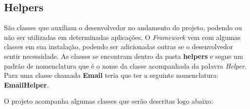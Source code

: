         \subsection{Helpers\label{sub:system-helper}}
            São classes que auxiliam o desenvolvedor no andamento do projeto, podendo ou não ser utilizadas em determinadas aplicações. O \emph{Framework} vem com algumas classes em sua instalação, podendo ser adicionadas outras se o desenvolvedor sentir necessidade. As classes se encontram dentro da pasta \textbf{helpers} e segue um padrão de nomenclatura que é o nome da classe acompanhada da palavra \emph{Helper}. Para uma classe chamada \textbf{Email} teria que ter a seguinte nomenclatura: \textbf{EmailHelper}.

            O projeto acompanha algumas classes que serão descritas logo abaixo:

